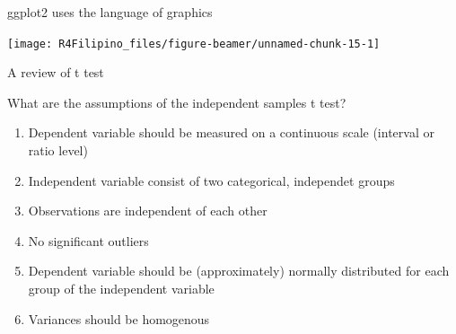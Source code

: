 \begin{frame}[fragile]{ggplot2 uses the language of graphics}

\begin{Shaded}
\begin{Highlighting}[]
\StringTok{ }\NormalTok{(}\OperatorTok{+}\StringTok{ }
\StringTok{  }\NormalTok{() }\OperatorTok{+}\StringTok{ }
\StringTok{  }\NormalTok{(}\NormalTok{) }\OperatorTok{+}\StringTok{ }
\StringTok{  }\NormalTok{(}\NormalTok{) }
\end{Highlighting}
\end{Shaded}

\begin{center}\texttt{[image: R4Filipino\_files/figure-beamer/unnamed-chunk-15-1]} \end{center}

\end{frame}

\begin{frame}{A review of t test}

What are the assumptions of the independent samples t test?

\begin{enumerate}
\def\labelenumi{\arabic{enumi}.}
\tightlist
\item
  Dependent variable should be measured on a continuous scale (interval
  or ratio level)
\item
  Independent variable consist of two categorical, independet groups
\item
  Observations are independent of each other
\item
  No significant outliers
\item
  Dependent variable should be (approximately) normally distributed for
  each group of the independent variable
\item
  Variances should be homogenous
\end{enumerate}

\end{frame}

